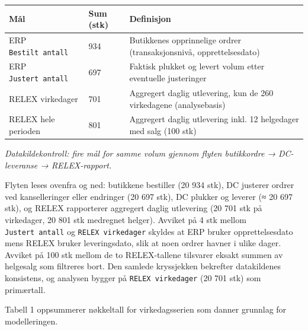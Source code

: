 \documentclass[
  norsk,
  11pt,
  a4paper,
]{article}
\newcounter{none} %
\begin{document}
{\def\LTcaptype{none} %
\begin{longtable}[]{@{}
  >{\raggedright\arraybackslash}p{}
  >{\raggedleft\arraybackslash}p{}
  >{\raggedright\arraybackslash}p{}@{}}
\toprule\noalign{}
\begin{minipage}[b]{\linewidth}\raggedright
Mål
\end{minipage} & \begin{minipage}[b]{\linewidth}\raggedleft
Sum (stk)
\end{minipage} & \begin{minipage}[b]{\linewidth}\raggedright
Definisjon
\end{minipage} \\
\midrule\noalign{}
\endhead
\bottomrule\noalign{}
\endlastfoot
ERP \texttt{Bestilt\ antall} & 20 934 & Butikkenes opprinnelige ordrer
(transaksjonsnivå, opprettelsesdato) \\
ERP \texttt{Justert\ antall} & 20 697 & Faktisk plukket og levert volum
etter eventuelle justeringer \\
RELEX virkedager & 20 701 & Aggregert daglig utlevering, kun de 260
virkedagene (analysebasis) \\
RELEX hele perioden & 20 801 & Aggregert daglig utlevering inkl. 12
helgedager med salg (100 stk) \\
\end{longtable}
}

\emph{Datakildekontroll: fire mål for samme volum gjennom flyten
butikkordre → DC-leveranse → RELEX-rapport.}

Flyten leses ovenfra og ned: butikkene bestiller (20 934 stk), DC
justerer ordrer ved kanselleringer eller endringer (20 697 stk), DC
plukker og leverer (≈ 20 697 stk), og RELEX rapporterer aggregert daglig
utlevering (20 701 stk på virkedager, 20 801 stk medregnet helger).
Avviket på 4 stk mellom \texttt{Justert\ antall} og
\texttt{RELEX\ virkedager} skyldes at ERP bruker opprettelsesdato mens
RELEX bruker leveringsdato, slik at noen ordrer havner i ulike dager.
Avviket på 100 stk mellom de to RELEX-tallene tilsvarer eksakt summen av
helgesalg som filtreres bort. Den samlede kryssjekken bekrefter
datakildenes konsistens, og analysen bygger på
\texttt{RELEX\ virkedager} (20 701 stk) som primærtall.

Tabell 1 oppsummerer nøkkeltall for virkedagsserien som danner grunnlag
for modelleringen.
\end{document}

